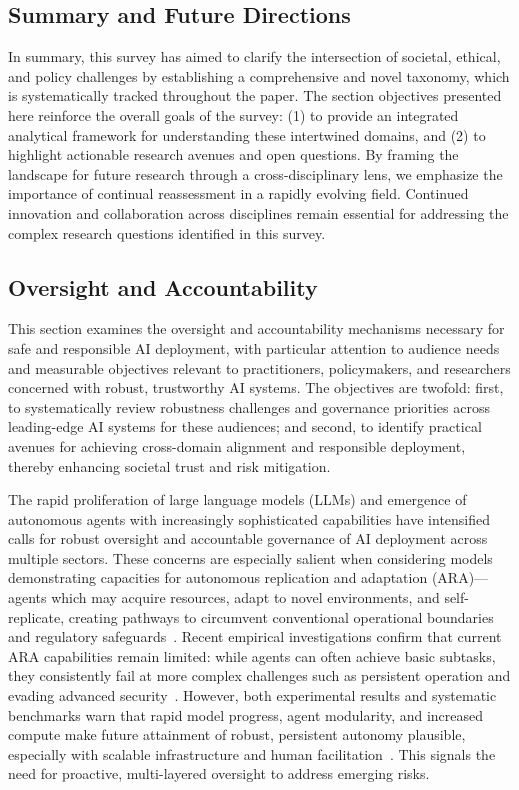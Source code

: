 \documentclass[sigconf]{acmart}
\begin{document}
\subsection{Summary and Future Directions}
In summary, this survey has aimed to clarify the intersection of societal, ethical, and policy challenges by establishing a comprehensive and novel taxonomy, which is systematically tracked throughout the paper. The section objectives presented here reinforce the overall goals of the survey: (1) to provide an integrated analytical framework for understanding these intertwined domains, and (2) to highlight actionable research avenues and open questions. By framing the landscape for future research through a cross-disciplinary lens, we emphasize the importance of continual reassessment in a rapidly evolving field. Continued innovation and collaboration across disciplines remain essential for addressing the complex research questions identified in this survey.

\subsection{Oversight and Accountability}

This section examines the oversight and accountability mechanisms necessary for safe and responsible AI deployment, with particular attention to audience needs and measurable objectives relevant to practitioners, policymakers, and researchers concerned with robust, trustworthy AI systems. The objectives are twofold: first, to systematically review robustness challenges and governance priorities across leading-edge AI systems for these audiences; and second, to identify practical avenues for achieving cross-domain alignment and responsible deployment, thereby enhancing societal trust and risk mitigation.

The rapid proliferation of large language models (LLMs) and emergence of autonomous agents with increasingly sophisticated capabilities have intensified calls for robust oversight and accountable governance of AI deployment across multiple sectors. These concerns are especially salient when considering models demonstrating capacities for autonomous replication and adaptation (ARA)—agents which may acquire resources, adapt to novel environments, and self-replicate, creating pathways to circumvent conventional operational boundaries and regulatory safeguards~\cite{ref21,ref25,ref26}. Recent empirical investigations confirm that current ARA capabilities remain limited: while agents can often achieve basic subtasks, they consistently fail at more complex challenges such as persistent operation and evading advanced security~\cite{ref21,ref23}. However, both experimental results and systematic benchmarks warn that rapid model progress, agent modularity, and increased compute make future attainment of robust, persistent autonomy plausible, especially with scalable infrastructure and human facilitation~\cite{ref21,ref23,ref25,ref53,ref54}. This signals the need for proactive, multi-layered oversight to address emerging risks.
\end{document}
